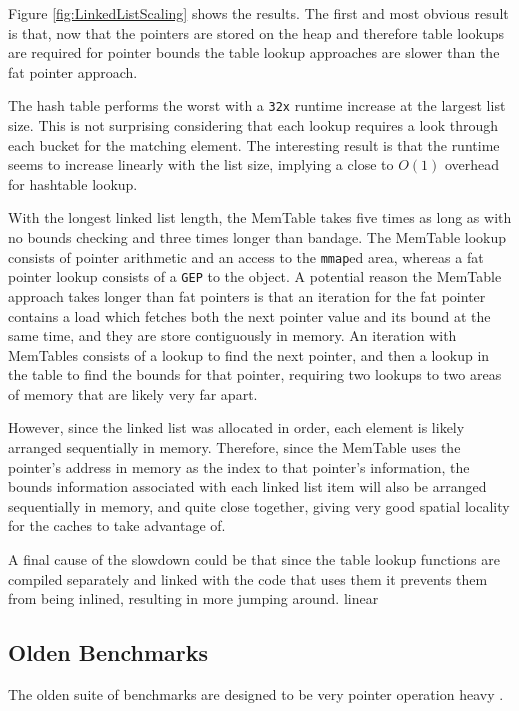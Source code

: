 

Figure \ref{fig:LinkedListScaling} shows the results.
The first and most obvious result is that, now that the pointers are stored on the heap and therefore table lookups are required for pointer bounds the table lookup approaches are slower than the fat pointer approach.

The hash table performs the worst with a \verb!32x! runtime increase at the largest list size.
This is not surprising considering that each lookup requires a look through each bucket for the matching element.
The interesting result is that the runtime seems to increase linearly with the list size, implying a close to $O(1)$ overhead for hashtable lookup.

With the longest linked list length, the MemTable takes five times as long as with no bounds checking and three times longer than bandage.
The MemTable lookup consists of pointer arithmetic and an access to the \verb!mmap!ed area, whereas a fat pointer lookup consists of a \verb!GEP! to the object.
A potential reason the MemTable approach takes longer than fat pointers is that an iteration for the fat pointer contains a load which fetches both the next pointer value and its bound at the same time, and they are store contiguously in memory.
An iteration with MemTables consists of a lookup to find the next pointer, and then a lookup in the table to find the bounds for that pointer, requiring two lookups to two areas of memory that are likely very far apart.

However, since the linked list was allocated in order, each element is likely arranged sequentially in memory.
Therefore, since the MemTable uses the pointer's address in memory as the index to that pointer's information, the bounds information associated with each linked list item will also be arranged sequentially in memory, and quite close together, giving very good spatial locality for the caches to take advantage of.

A final cause of the slowdown could be that since the table lookup functions are compiled separately and linked with the code that uses them it prevents them from being inlined, resulting in more jumping around.
 linear

\subsection{Olden Benchmarks}

The olden suite of benchmarks are designed to be very pointer operation heavy \cite{olden}.

